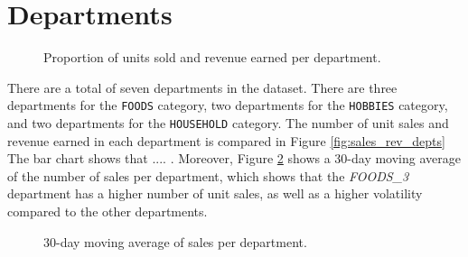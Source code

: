 \section{Departments}
\begin{figure}
    \vspace{-10pt}
    \centering
    \captionsetup{width=0.52\textwidth}
    \caption{Proportion of units sold and revenue earned per department.}
    \label{fig:depts_rev_stores}
    \vspace{-10pt}
\end{figure}
There are a total of seven departments in the dataset. 
There are three departments for the \texttt{FOODS} category, two departments for the \texttt{HOBBIES} category, and two departments for the \texttt{HOUSEHOLD} category.
The number of unit sales and revenue earned in each department is compared in Figure \ref{fig:sales_rev_depts}
The bar chart shows that .... .
Moreover, Figure \ref{fig:dept_sales} shows a 30-day moving average of the number of sales per department, which shows that the \textit{FOODS\_3} department has a higher number of unit sales, as well as a higher volatility compared to the other departments.

\begin{figure}[H]
    \centering
    \caption{30-day moving average of sales per department.}
    \label{fig:dept_sales}
\end{figure}
